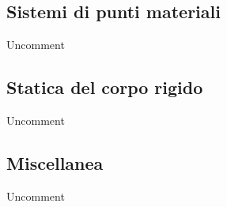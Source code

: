 \documentclass[letterpaper,10pt,italian]{jupyterBook}
\begin{document}
\subsection{Sistemi di punti materiali}
\label{\detokenize{ch/mechanics/statics-problems:sistemi-di-punti-materiali}}
\sphinxAtStartPar
Uncomment




\subsection{Statica del corpo rigido}
\label{\detokenize{ch/mechanics/statics-problems:statica-del-corpo-rigido}}
\sphinxAtStartPar
Uncomment




\subsection{Miscellanea}
\label{\detokenize{ch/mechanics/statics-problems:miscellanea}}
\sphinxAtStartPar
Uncomment
\end{document}
